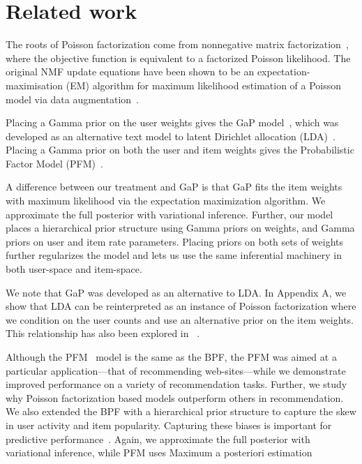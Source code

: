 \section{Related work}
The roots of Poisson factorization come from nonnegative matrix
factorization~\cite{Lee:1999}, where the objective function is
equivalent to a factorized Poisson likelihood.  The original NMF
update equations have been shown to be an expectation-maximisation
(EM) algorithm for maximum likelihood estimation of a Poisson model
via data augmentation~\cite{Cemgil:2009}.

Placing a Gamma prior on the user weights gives the GaP
model~\cite{Canny:2004}, which was developed as an alternative text
model to latent Dirichlet allocation (LDA)~\cite{Blei:2003b}. Placing
a Gamma prior on both the user and item weights gives the
Probabilistic Factor Model (PFM)~\cite{Ma:2011}.

A difference between our treatment and GaP is that GaP fits the item
weights with maximum likelihood via the expectation maximization
algorithm. We approximate the full posterior with variational
inference. Further, our model places a hierarchical prior structure
using Gamma priors on weights, and Gamma priors on user and item rate
parameters.  Placing priors on both sets of weights further
regularizes the model and lets us use the same inferential machinery
in both user-space and item-space. 

We note that GaP was developed as an alternative to LDA. In Appendix
A, we show that LDA can be reinterpreted as an instance of Poisson
factorization where we condition on the user counts and use an
alternative prior on the item weights. This relationship has also been
explored in ~\cite{Inouye:2014}.

Although the PFM~\cite{Ma:2011} model is the same as the BPF, the PFM
was aimed at a particular application---that of recommending
web-sites---while we demonstrate improved performance on a variety of
recommendation tasks. Further, we study why Poisson factorization
based models outperform others in recommendation. We also extended the
BPF with a hierarchical prior structure to capture the skew in user
activity and item popularity. Capturing these biases is important for
predictive performance~\cite{Koren:2009}. Again, we approximate the
full posterior with variational inference, while PFM uses Maximum a
posteriori estimation


